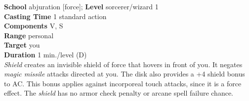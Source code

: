 \textbf{School} abjuration [force]; \textbf{Level} sorcerer/wizard 1\\
\textbf{Casting Time} 1 standard action\\
\textbf{Components} V, S\\
\textbf{Range} personal\\
\textbf{Target} you\\
\textbf{Duration} 1 min./level (D)\\
\textit{Shield }creates an invisible shield of force that hovers in front of you. It negates \textit{magic missile }attacks directed at you. The disk also provides a +4 shield bonus to AC. This bonus applies against incorporeal touch attacks, since it is a force effect. The \textit{shield }has no armor check penalty or arcane spell failure chance.\\
